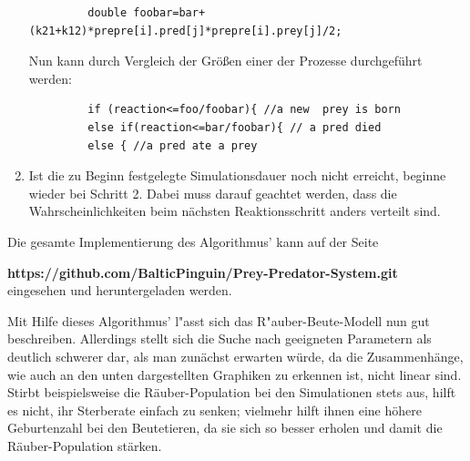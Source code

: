 \documentclass[11pt]{article}
\begin{document}
\begin{enumerate}
\begin{verbatim}
         double foobar=bar+(k21+k12)*prepre[i].pred[j]*prepre[i].prey[j]/2;
        \end{verbatim}
     Nun kann durch Vergleich der Größen einer der Prozesse durchgeführt werden:
        \begin{verbatim}
         if (reaction<=foo/foobar){ //a new  prey is born
         else if(reaction<=bar/foobar){ // a pred died
         else { //a pred ate a prey
        \end{verbatim}
   \item Ist die zu Beginn festgelegte Simulationsdauer noch nicht erreicht, beginne wieder bei Schritt 2. Dabei muss darauf geachtet werden, dass die Wahrscheinlichkeiten beim nächsten Reaktionsschritt anders verteilt sind.
\end{enumerate}
Die gesamte Implementierung des Algorithmus' kann auf der Seite

 \textbf{https://github.com/BalticPinguin/Prey-Predator-System.git} \\
eingesehen und heruntergeladen werden.

Mit Hilfe dieses Algorithmus' l"asst sich das R"auber-Beute-Modell nun gut beschreiben. Allerdings stellt sich die Suche nach geeigneten Parametern als deutlich schwerer dar, als man zunächst erwarten würde, da die Zusammenhänge, wie auch an den unten dargestellten Graphiken zu erkennen ist, nicht linear sind. Stirbt beispielsweise die Räuber-Population bei den Simulationen stets aus, hilft es nicht, ihr Sterberate einfach zu senken; vielmehr hilft ihnen eine höhere Geburtenzahl bei den Beutetieren, da sie sich so besser erholen und damit die Räuber-Population stärken.\\
\end{document}
